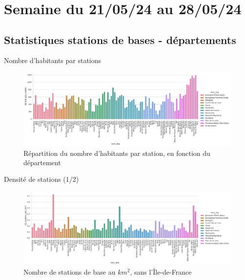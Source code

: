 \smallframetitle

\section{Semaine du 21/05/24 au 28/05/24}
\insertsectionframe

\subsection{Statistiques stations de bases - départements}
\insertsubsectionframe

\begin{frame}{Nombre d'habitants par stations}
    \begin{figure}
        \includegraphics[height=0.55\paperheight]{images/barplots/nb_hab_par_station_par_dep.png}
        \caption{\label{fig:nb_hap_par_stat_par_dep}Répartition du nombre d'habitants par station, en fonction du département}
    \end{figure}
\end{frame}

\begin{frame}{Densité de stations (1/2)}
    \begin{figure}
        \includegraphics[height=0.55\paperheight]{images/barplots/densite_station_par_dep_sansIDF.png}
        \caption{\label{fig:densite_stat_ssIDF}Nombre de stations de base au $\unit{km^2}$, sans l'Île-de-France}
    \end{figure}
\end{frame}

